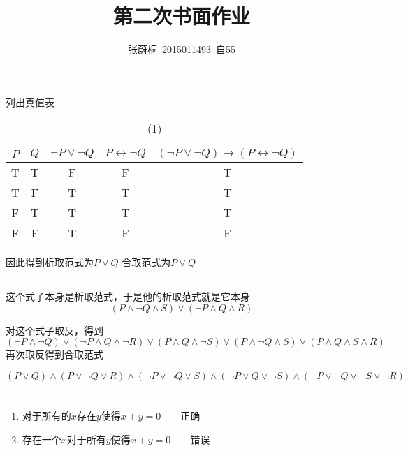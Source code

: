 \documentclass[UTF8,a4paper]{paper}
\title{第二次书面作业}
\author{张蔚桐\ 2015011493\ 自55}
\begin{document}
\maketitle
\section{}
\subsection{}
列出真值表
\begin{table}[H]
\centering
\caption{(1)}
\begin{tabular}{|c|c|c|c|c|}
\hline
$P$&$Q$&$\neg P\lor\neg Q$&$P\leftrightarrow \neg Q$&$(\neg P\lor\neg Q)\rightarrow(P\leftrightarrow \neg Q)$\\
\hline 
T&T&F&F&T\\
\hline
T&F&T&T&T\\
\hline
F&T&T&T&T\\
\hline
F&F&T&F&F\\
\hline
\end{tabular}
\end{table}
因此得到析取范式为$P\lor Q$
合取范式为$P\lor Q$

\subsection{}
这个式子本身是析取范式，于是他的析取范式就是它本身
$$(P\land \neg Q\land S)\lor(\neg P\land Q\land R)$$

对这个式子取反，得到$$(\neg P\land\neg Q)\lor(\neg P\land Q\land\neg R)\lor(P\land Q\land\neg S)\lor(P\land\neg Q\land S)\lor(P\land Q\land S\land R)$$
再次取反得到合取范式

$$(P\lor Q)\land(P\lor\neg Q\lor R)\land(\neg P\lor\neg Q\lor S)\land(\neg P\lor Q\lor\neg S)\land(\neg P\lor\neg Q\lor\neg S\lor\neg R)$$
\section{}
\begin{enumerate}
\item 对于所有的$x$存在$y$使得$x+y=0$\ \ \ \ 正确
\item 存在一个$x$对于所有$y$使得$x+y=0$\ \ \ \ 错误
\end{enumerate}
\section{}
\end{document}

